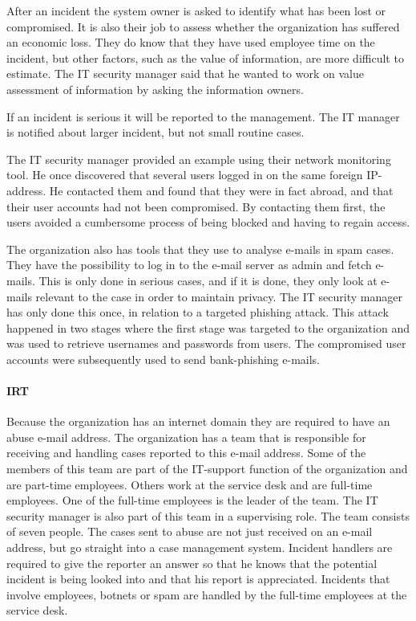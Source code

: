 After an incident the system owner is asked to identify what has been lost or compromised. It is also their job to assess whether the organization has suffered an economic loss. They do know that they have used employee time on the incident, but other factors, such as the value of information, are more difficult to estimate. The IT security manager said that he wanted to work on value assessment of information by asking the information owners.

If an incident is serious it will be reported to the management. The IT manager is notified about larger incident, but not small routine cases.

The IT security manager provided an example using their network monitoring tool. He once discovered that several users logged in on the same foreign IP-address. He contacted them and found that they were in fact abroad, and that their user accounts had not been compromised. By contacting them first, the users avoided a cumbersome process of being blocked and having to regain access. 

The organization also has tools that they use to analyse e-mails in spam cases. They have the possibility to log in to the e-mail server as admin and fetch e-mails. This is only done in serious cases, and if it is done, they only look at e-mails relevant to the case in order to maintain privacy. The IT security manager has only done this once, in relation to a targeted phishing attack. This attack happened in two stages where the first stage was targeted to the organization and was used to retrieve usernames and passwords from users. The compromised user accounts were subsequently used to send bank-phishing e-mails.

\paragraph{\acl{IRT}}
Because the organization has an internet domain they are required to have an abuse e-mail address. The organization has a team that is responsible for receiving and handling cases reported to this e-mail address. Some of the members of this team are part of the IT-support function of the organization and are part-time employees. Others work at the service desk and are full-time employees. One of the full-time employees is the leader of the team. The IT security manager is also part of this team in a supervising role. The team consists of seven people. The cases sent to abuse are not just received on an e-mail address, but go straight into a case management system. Incident handlers are required to give the reporter an answer so that he knows that the potential incident is being looked into and that his report is appreciated. Incidents that involve employees, botnets or spam are handled by the full-time employees at the service desk.

